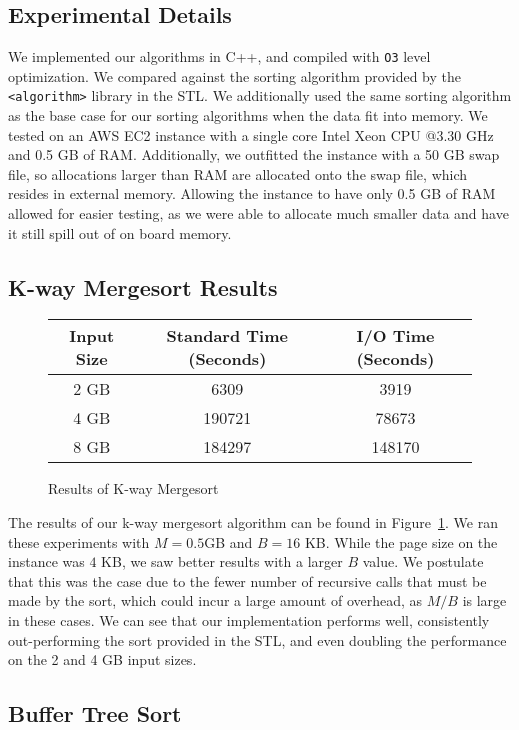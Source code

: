 \documentclass{article}
\begin{document}
\subsection{Experimental Details}
We implemented our algorithms in C++, and compiled with \texttt{O3} level
optimization.
%
We compared against the sorting algorithm provided by the
\texttt{<algorithm>} library in the STL.
%
We additionally used the same sorting algorithm as the base case for our
sorting algorithms when the data fit into memory.
%
We tested on an AWS EC2 instance with a single core Intel Xeon CPU @3.30 GHz and 0.5 GB of RAM.
%
Additionally, we outfitted the instance with a 50 GB swap file, so allocations
larger than RAM are allocated onto the swap file, which resides in external memory.
%
Allowing the instance to have only 0.5 GB of RAM allowed for easier testing,
as we were able to allocate much smaller data and have it still spill out of
on board memory.

\subsection{K-way Mergesort Results}

\begin{figure}
  \centering
  \begin{tabular}{|c|c|c|}
    \hline
    Input Size & Standard Time (Seconds) & I/O Time (Seconds)\\
    \hline
    \hline
    2 GB & 6309 & 3919 \\
    \hline
    4 GB & 190721 & 78673 \\
    \hline
    8 GB & 184297 & 148170 \\
    \hline
  \end{tabular}
  \caption{Results of K-way Mergesort}
  \label{k-merge-res}
\end{figure}

The results of our k-way mergesort algorithm can be found in Figure~\ref{k-merge-res}.
%
We ran these experiments with $M = 0.5$GB and $B = 16$ KB.
%
While the page size on the instance was $4$ KB, we saw better results with a larger $B$
value.
%
We postulate that this was the case due to the fewer number of recursive calls that must be
made by the sort, which could incur a large amount of overhead, as $M/B$ is large in these cases.
%
We can see that our implementation performs well, consistently out-performing the sort
provided in the STL, and even doubling the performance on the 2 and 4 GB input sizes.

\subsection{Buffer Tree Sort}
\end{document}
